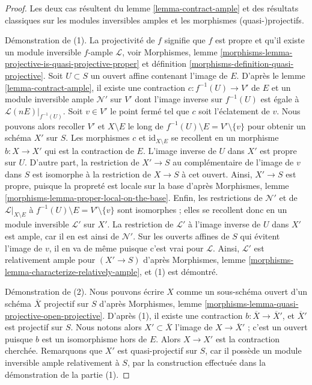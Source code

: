 \begin{proof} Les deux cas résultent du lemme \ref{lemma-contract-ample} et des résultats classiques sur les modules inversibles amples et les morphismes (quasi-)projectifs.

\medskip\noindent Démonstration de (1). La projectivité de $f$ signifie que $f$ est propre et qu'il existe un module inversible $f$-ample $\mathcal{L}$, voir Morphismes, lemme \ref{morphisms-lemma-projective-is-quasi-projective-proper} et définition \ref{morphisms-definition-quasi-projective}. Soit $U \subset S$ un ouvert affine contenant l'image de $E$. D'après le lemme \ref{lemma-contract-ample}, il existe une contraction $c : f^{-1}(U) \to V'$ de $E$ et un module inversible ample $\mathcal{N}'$ sur $V'$ dont l'image inverse sur $f^{-1}(U)$ est égale à $\mathcal{L}(nE)|_{f^{-1}(U)}$. Soit $v \in V'$ le point fermé tel que $c$ soit l'éclatement de $v$. Nous pouvons alors recoller $V'$ et $X \setminus E$ le long de $f^{-1}(U) \setminus E = V' \setminus \{v\}$ pour obtenir un schéma $X'$ sur $S$. Les morphismes $c$ et $\text{id}_{X \setminus E}$ se recollent en un morphisme $b : X \to X'$ qui est la contraction de $E$. L'image inverse de $U$ dans $X'$ est propre sur $U$. D'autre part, la restriction de $X' \to S$ au complémentaire de l'image de $v$ dans $S$ est isomorphe à la restriction de $X \to S$ à cet ouvert. Ainsi, $X' \to S$ est propre, puisque la propreté est locale sur la base d'après Morphismes, lemme \ref{morphisms-lemma-proper-local-on-the-base}. Enfin, les restrictions de $\mathcal{N}'$ et de $\mathcal{L}|_{X \setminus E}$ à $f^{-1}(U) \setminus E = V' \setminus \{v\}$ sont isomorphes ; elles se recollent donc en un module inversible $\mathcal{L}'$ sur $X'$. La restriction de $\mathcal{L}'$ à l'image inverse de $U$ dans $X'$ est ample, car il en est ainsi de $\mathcal{N}'$. Sur les ouverts affines de $S$ qui évitent l'image de $v$, il en va de même puisque c'est vrai pour $\mathcal{L}$. Ainsi, $\mathcal{L}'$ est relativement ample pour $(X' \to S)$ d'après Morphismes, lemme \ref{morphisms-lemma-characterize-relatively-ample}, et (1) est démontré.

\medskip\noindent Démonstration de (2). Nous pouvons écrire $X$ comme un sous-schéma ouvert d'un schéma $\overline{X}$ projectif sur $S$ d'après Morphismes, lemme \ref{morphisms-lemma-quasi-projective-open-projective}. D'après (1), il existe une contraction $b : \overline{X} \to \overline{X}'$, et $\overline{X}'$ est projectif sur $S$. Nous notons alors $X' \subset \overline{X}$ l'image de $X \to \overline{X}'$ ; c'est un ouvert puisque $b$ est un isomorphisme hors de $E$. Alors $X \to X'$ est la contraction cherchée. Remarquons que $X'$ est quasi-projectif sur $S$, car il possède un module inversible ample relativement à $S$, par la construction effectuée dans la démonstration de la partie (1). \end{proof}

